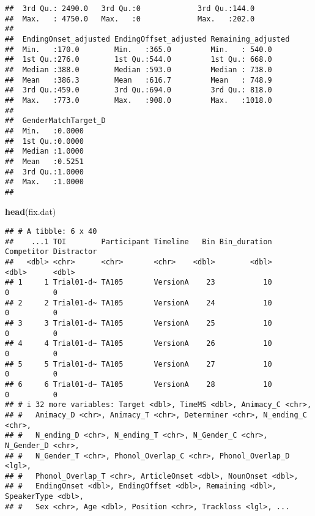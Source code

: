 \documentclass[
]{article}
\newenvironment{Shaded}{\begin{snugshade}}{\end{snugshade}}
\newcommand{\FunctionTok}[1]{\textcolor[rgb]{0.13,0.29,0.53}{\textbf{#1}}}
\newcommand{\NormalTok}[1]{#1}
\begin{document}
\begin{verbatim}
##  3rd Qu.: 2490.0   3rd Qu.:0             3rd Qu.:144.0     
##  Max.   : 4750.0   Max.   :0             Max.   :202.0     
##                                                            
##  EndingOnset_adjusted EndingOffset_adjusted Remaining_adjusted
##  Min.   :170.0        Min.   :365.0         Min.   : 540.0    
##  1st Qu.:276.0        1st Qu.:544.0         1st Qu.: 668.0    
##  Median :388.0        Median :593.0         Median : 738.0    
##  Mean   :386.3        Mean   :616.7         Mean   : 748.9    
##  3rd Qu.:459.0        3rd Qu.:694.0         3rd Qu.: 818.0    
##  Max.   :773.0        Max.   :908.0         Max.   :1018.0    
##                                                               
##  GenderMatchTarget_D
##  Min.   :0.0000     
##  1st Qu.:0.0000     
##  Median :1.0000     
##  Mean   :0.5251     
##  3rd Qu.:1.0000     
##  Max.   :1.0000     
## 
\end{verbatim}

\begin{Shaded}
\begin{Highlighting}[]
\FunctionTok{head}\NormalTok{(fix.dat)}
\end{Highlighting}
\end{Shaded}

\begin{verbatim}
## # A tibble: 6 x 40
##    ...1 TOI        Participant Timeline   Bin Bin_duration Competitor Distractor
##   <dbl> <chr>      <chr>       <chr>    <dbl>        <dbl>      <dbl>      <dbl>
## 1     1 Trial01-d~ TA105       VersionA    23           10          0          0
## 2     2 Trial01-d~ TA105       VersionA    24           10          0          0
## 3     3 Trial01-d~ TA105       VersionA    25           10          0          0
## 4     4 Trial01-d~ TA105       VersionA    26           10          0          0
## 5     5 Trial01-d~ TA105       VersionA    27           10          0          0
## 6     6 Trial01-d~ TA105       VersionA    28           10          0          0
## # i 32 more variables: Target <dbl>, TimeMS <dbl>, Animacy_C <chr>,
## #   Animacy_D <chr>, Animacy_T <chr>, Determiner <chr>, N_ending_C <chr>,
## #   N_ending_D <chr>, N_ending_T <chr>, N_Gender_C <chr>, N_Gender_D <chr>,
## #   N_Gender_T <chr>, Phonol_Overlap_C <chr>, Phonol_Overlap_D <lgl>,
## #   Phonol_Overlap_T <chr>, ArticleOnset <dbl>, NounOnset <dbl>,
## #   EndingOnset <dbl>, EndingOffset <dbl>, Remaining <dbl>, SpeakerType <dbl>,
## #   Sex <chr>, Age <dbl>, Position <chr>, Trackloss <lgl>, ...
\end{verbatim}
\end{document}
